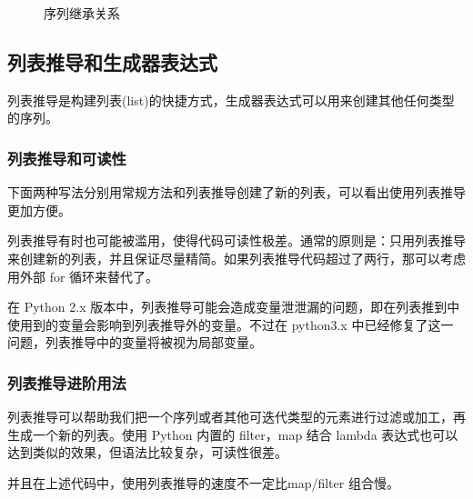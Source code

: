 \begin{figure}[H]
    \caption{序列继承关系}
    \label{序列继承关系}
\end{figure}

\subsection{列表推导和生成器表达式}

列表推导是构建列表(list)的快捷方式，生成器表达式可以用来创建其他任何类型的序列。

\subsubsection{列表推导和可读性}

下面两种写法分别用常规方法和列表推导创建了新的列表，可以看出使用列表推导更加方便。




列表推导有时也可能被滥用，使得代码可读性极差。通常的原则是：只用列表推导来创建新的列表，并且保证尽量精简。如果列表推导代码超过了两行，那可以考虑用外部 for 循环来替代了。

在 Python 2.x 版本中，列表推导可能会造成变量泄泄漏的问题，即在列表推到中使用到的变量会影响到列表推导外的变量。不过在 python3.x 中已经修复了这一问题，列表推导中的变量将被视为局部变量。

\subsubsection{列表推导进阶用法}

列表推导可以帮助我们把一个序列或者其他可迭代类型的元素进行过滤或加工，再生成一个新的列表。使用 Python 内置的 filter，map 结合 lambda 表达式也可以达到类似的效果，但语法比较复杂，可读性很差。



并且在上述代码中，使用列表推导的速度不一定比map/filter 组合慢。

